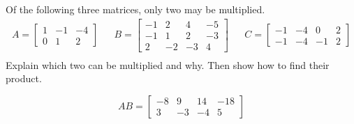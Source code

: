 
\begin{exerciseStatement}


Of the following three matrices, only two may be multiplied. 
\begin{align*} A= \left[\begin{array}{ccc}
1 & -1 & -4 \\
0 & 1 & 2
\end{array}\right]  & & B= \left[\begin{array}{cccc}
-1 & 2 & 4 & -5 \\
-1 & 1 & 2 & -3 \\
2 & -2 & -3 & 4
\end{array}\right]  & & C= \left[\begin{array}{cccc}
-1 & -4 & 0 & 2 \\
-1 & -4 & -1 & 2
\end{array}\right]  \\ \end{align*}
             Explain which two can be multiplied and why. Then show how to find their product.


\end{exerciseStatement}
    
\begin{exerciseAnswer} 
\[AB= \left[\begin{array}{cccc}
-8 & 9 & 14 & -18 \\
3 & -3 & -4 & 5
\end{array}\right] \]
\end{exerciseAnswer}
    
